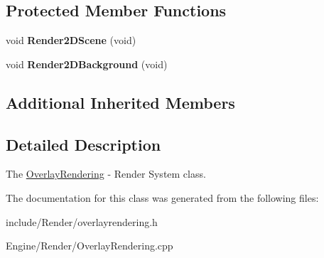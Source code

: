 \subsection*{Protected Member Functions}
\begin{DoxyCompactItemize}
\item 
\hypertarget{classEngine_1_1OverlayRendering_a8157f82ae8e2e9d7a82759cdb4e7a8c0}{}void {\bfseries Render2\+D\+Scene} (void)\label{classEngine_1_1OverlayRendering_a8157f82ae8e2e9d7a82759cdb4e7a8c0}

\item 
\hypertarget{classEngine_1_1OverlayRendering_a5fcdc41ce4353282dad9fe2b1ca7e5e7}{}void {\bfseries Render2\+D\+Background} (void)\label{classEngine_1_1OverlayRendering_a5fcdc41ce4353282dad9fe2b1ca7e5e7}

\end{DoxyCompactItemize}
\subsection*{Additional Inherited Members}


\subsection{Detailed Description}
The \hyperlink{classEngine_1_1OverlayRendering}{Overlay\+Rendering} -\/ Render System class. 

The documentation for this class was generated from the following files\+:\begin{DoxyCompactItemize}
\item 
include/\+Render/overlayrendering.\+h\item 
Engine/\+Render/Overlay\+Rendering.\+cpp\end{DoxyCompactItemize}

